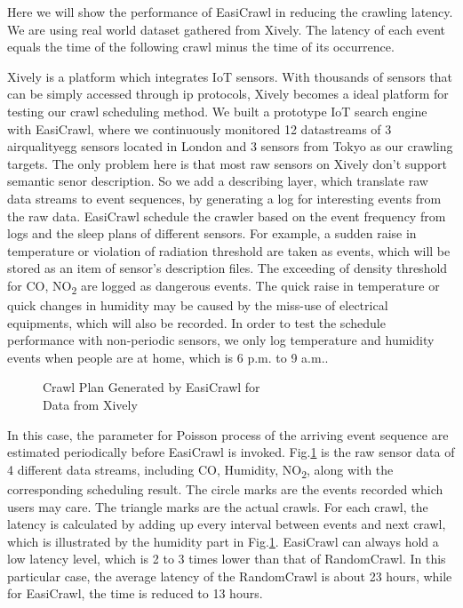 \documentclass[conference]{IEEEtran}
\begin{document}
Here we will show the performance of EasiCrawl in reducing the crawling latency. 
We are using real world dataset gathered from Xively.
The latency of each event equals the time of the following crawl minus the time of its occurrence.

Xively is a platform which integrates IoT sensors. 
With thousands of sensors that can be simply accessed through ip protocols, Xively becomes a ideal platform for testing our crawl scheduling method.
We built a prototype IoT search engine with EasiCrawl, where we continuously monitored 12 datastreams of 3 airqualityegg\cite{airegg} sensors located in London and 3 sensors from Tokyo as our crawling targets. 
The only problem here is that most raw sensors on Xively don't support semantic senor description. 
So we add a describing layer, which translate raw data streams to event sequences, by generating a log for interesting events from the raw data.
EasiCrawl schedule the crawler based on the event frequency from logs and the sleep plans of different sensors.
For example, a sudden raise in temperature or violation of radiation threshold are taken as events, which will be stored as an item of sensor's description files.
The exceeding of density threshold for CO, NO\textsubscript{2} are logged as dangerous events.
The quick raise in temperature or quick changes in humidity may be caused by the miss-use of electrical equipments, which will also be recorded.
In order to test the schedule performance with non-periodic sensors, we only log temperature and humidity events when people are at home, which is 6 p.m. to 9 a.m..

\begin{figure}
	\centering
	\hspace{-1.0em}
	
	\captionsetup{justification=centering}
	\caption{Crawl Plan Generated by EasiCrawl for \\
		Data from Xively}
	\vspace{-1.5em}
	\label{fig:xivelycasestudy}
\end{figure}

In this case, the parameter for Poisson process of the arriving event sequence are estimated periodically before EasiCrawl is invoked.
Fig.\ref{fig:xivelycasestudy} is the raw sensor data of 4 different data streams, including CO, Humidity, NO\textsubscript{2}, along with the corresponding scheduling result. 
The circle marks are the events recorded which users may care. 
The triangle marks are the actual crawls. 
For each crawl, the latency is calculated by adding up every interval between events and next crawl, which is illustrated by the humidity part in Fig.\ref{fig:xivelycasestudy}.
EasiCrawl can always hold a low latency level, which is 2 to 3 times lower than that of RandomCrawl.
In this particular case, the average latency of the RandomCrawl is about 23 hours, while for EasiCrawl, the time is reduced to 13 hours. 
\end{document}
